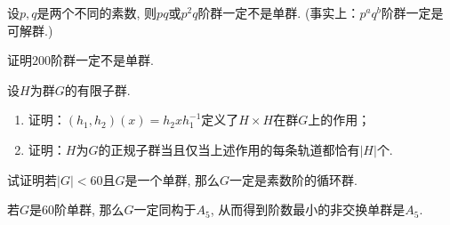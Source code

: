 \begin{problem}
    设$p, q$是两个不同的素数, 则$pq$或$p^2q$阶群一定不是单群.
(事实上：$p^aq^b$阶群一定是可解群.)
\end{problem}

\begin{solution}
    
\end{solution}

\begin{problem}
    证明$200$阶群一定不是单群.
\end{problem}

\begin{solution}
    
\end{solution}

\begin{problem}
    设$H$为群$G$的有限子群.
\begin{enumerate}[(1)]
    \item 证明：$(h_1, h_2)(x) = h_2xh_1^{-1}$定义了$H \times H$在群$G$上的作用；
    \item 证明：$H$为$G$的正规子群当且仅当上述作用的每条轨道都恰有$|H|$个.
\end{enumerate}
\end{problem}

\begin{solution}
    
\end{solution}

\begin{problem}
    试证明若$|G| < 60$且$G$是一个单群, 那么$G$一定是素数阶的循环群.
\end{problem}

\begin{solution}
    
\end{solution}

\begin{problem}
    若$G$是$60$阶单群, 那么$G$一定同构于$A_5$,
从而得到阶数最小的非交换单群是$A_5$.
\end{problem}

\begin{solution}
    
\end{solution}